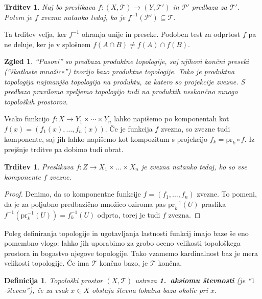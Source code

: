 \documentclass[10pt, a4paper]{article}
\newtheorem{trditev}[izr]{Trditev}
\newtheorem{defi}{Definicija}[section]
\newenvironment{noticeB}{%
  \tcolorbox[%
  notitle,
  empty,
  enhanced,  %
  breakable,
  coltext=black,
  colback=white, 
  fontupper=\rmfamily,
  parbox=false,
  noparskip,
  sharp corners,
  boxrule=-1pt,  %
  frame hidden,
  left=7pt,  %
  right=7pt,
  top=5pt,
  bottom=5pt,
  before skip=2.5ex plus 2pt,
  after skip=2.5ex plus 2pt,
  borderline west = {1.5pt}{-0.1pt}{blue!30!black}, %
  overlay unbroken and last={%
    \draw[color=black, line width=1.25pt]
    ($(frame.south west)+(1.pt, -0.1pt)$) -- ++(2em, 0);
  }
  ]}
{\endtcolorbox}
\newenvironment{definicija}{\begin{noticeB}\begin{defi}}{%
    \end{defi}\end{noticeB}}
\newtheorem{zgled}{Zgled}[section]
\newenvironment{noticeC}{%
  \tcolorbox[%
  notitle,
  empty,
  enhanced,  %
  breakable,
  coltext=black, 
  fontupper=\rmfamily,
  parbox=false,
  noparskip,
  sharp corners,
  boxrule=-1pt,  %
  frame hidden,
  left=7pt,  %
  right=7pt,
  top=5pt,
  bottom=5pt,
  before skip=2.5ex plus 2pt,
  after skip=2.5ex plus 2pt,
  overlay unbroken and last={%
  },
  ]}
{\endtcolorbox}
\newenvironment{dokaz}%
  {\begin{noticeC}\begin{proof}}%
  {\end{proof}\end{noticeC}}
\begin{document}
\begin{trditev}
  Naj bo preslikava $f: (X, \mathcal{T}) \to (Y, \mathcal{T}')$ in $\mathcal{P}'$ predbaza za $\mathcal{T}'$.
  Potem je $f$ zvezna natanko tedaj, ko je $f^{-1} (\mathcal{P}') \subseteq \mathcal{T}$.
\end{trditev}

Ta trditev velja, ker $f^{-1}$ ohranja unije in preseke.
Podoben test za odprtost $f$ pa ne deluje, ker je v splošnem $f(A \cap B) \neq f(A) \cap f(B)$.

\begin{zgled}
  "`Pasovi"' so predbaza produktne topologije, saj njihovi končni preseki ("`škatlaste množice"') tvorijo 
  bazo produktne topologije. Tako je produktna topologija najmanjša topologija na produktu, za katero so projekcije zvezne.
  S predbazo praviloma vpeljemo topologijo tudi na produktih neskončno mnogo topoloških prostorov.
\end{zgled}

Vsako funkcijo $f: X \to Y_1 \times \cdots \times Y_n$ lahko napišemo po komponentah kot $f (x) = (f_1 (x), \dots, f_n (x))$.
Če je funkcija $f$ zvezna, so zvezne tudi komponente, saj jih lahko napišemo kot kompozitum s projekcijo $f_k = \mathrm{pr}_k \circ f$.
Iz prejšnje trditve pa dobimo tudi obrat.

\begin{trditev}
  Preslikava $f: Z \to X_1 \times \dots \times X_n$ je zvezna natanko tedaj, ko so vse komponente $f$ zvezne.
\end{trditev}

\begin{dokaz}
  Denimo, da so komponentne funkcije $f = (f_1, \dots, f_n)$ zvezne.
  To pomeni, da je za poljubno predbazično množico oziroma pas $\mathrm{pr}_k ^{-1} (U)$ praslika $f^{-1} (\mathrm{pr}_k ^{-1} (U)) = f_k ^{-1} (U)$ odprta,
  torej je tudi $f$ zvezna.
\end{dokaz}

Poleg definiranja topologije in ugotavljanja lastnosti funkcij imajo 
baze še eno pomembno vlogo: lahko jih uporabimo za grobo oceno velikosti topološkega prostora 
in bogastvo njegove topologije.
Tako vzamemo kardinalnost baz je mera velikosti topologije.
Če ima $\mathcal{T}$ končno bazo, je $\mathcal{T}$ končna.

\begin{definicija}
  Topološki prostor $(X, \mathcal{T})$ ustreza \textbf{1.~aksiomu števnosti} (je "`$1$-števen"'),
  če za vsak $x \in X$ obstaja števna lokalna baza okolic pri $x$.
\end{definicija}
\end{document}
